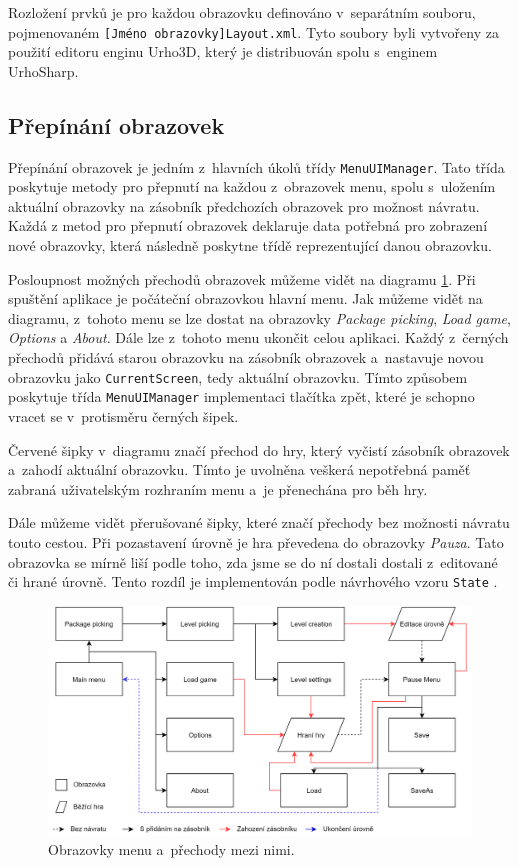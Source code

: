 Rozložení prvků je pro každou obrazovku definováno v~separátním souboru, pojmenovaném \texttt{[Jméno obrazovky]Layout.xml}. Tyto soubory byli vytvořeny za použití editoru enginu Urho3D, který je distribuován spolu s~enginem UrhoSharp. 

\subsection{Přepínání obrazovek}
Přepínání obrazovek je jedním z~hlavních úkolů třídy \texttt{MenuUIManager}. Tato třída poskytuje metody pro přepnutí na každou z~obrazovek menu, spolu s~uložením aktuální obrazovky na zásobník předchozích obrazovek pro možnost návratu. Každá z  metod pro přepnutí obrazovek deklaruje data potřebná pro zobrazení nové obrazovky, která následně poskytne třídě reprezentující danou obrazovku.

Posloupnost možných přechodů obrazovek můžeme vidět na diagramu \ref{fig:screen_structure}. Při spuštění aplikace je počáteční obrazovkou hlavní menu. Jak můžeme vidět na diagramu, z~tohoto menu se lze dostat na obrazovky \textit{Package picking}, \textit{Load game}, \textit{Options} a \textit{About}. Dále lze z~tohoto menu ukončit celou aplikaci. Každý z~černých přechodů přidává starou obrazovku na zásobník obrazovek a~nastavuje novou obrazovku jako \texttt{CurrentScreen}, tedy aktuální obrazovku. Tímto způsobem poskytuje třída \texttt{MenuUIManager} implementaci tlačítka zpět, které je schopno vracet se v~protisměru černých šipek.

Červené šipky v~diagramu značí přechod do hry, který vyčistí zásobník obrazovek a~zahodí aktuální obrazovku. Tímto je uvolněna veškerá nepotřebná paměť zabraná uživatelským rozhraním menu a~je přenechána pro běh hry.

Dále můžeme vidět přerušované šipky, které značí přechody bez možnosti návratu touto cestou. Při pozastavení úrovně je hra převedena do obrazovky \textit{Pauza}. Tato obrazovka se mírně liší podle toho, zda jsme se do ní dostali dostali z~editované či hrané úrovně. Tento rozdíl je implementován podle návrhového vzoru \texttt{State} \citep[str.~305]{book:gangoffour}.

\begin{figure}[h]
	\centering
	\includegraphics[width=\textwidth]{img/ScreenStructure.png}
	\caption{Obrazovky menu a~přechody mezi nimi.}
	\label{fig:screen_structure}
\end{figure}


